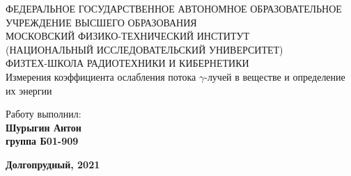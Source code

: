 \begin{center}
    {\small ФЕДЕРАЛЬНОЕ ГОСУДАРСТВЕННОЕ АВТОНОМНОЕ ОБРАЗОВАТЕЛЬНОЕ\\ УЧРЕЖДЕНИЕ ВЫСШЕГО ОБРАЗОВАНИЯ\\ МОСКОВСКИЙ ФИЗИКО-ТЕХНИЧЕСКИЙ ИНСТИТУТ\\ (НАЦИОНАЛЬНЫЙ ИССЛЕДОВАТЕЛЬСКИЙ УНИВЕРСИТЕТ)\\ ФИЗТЕХ-ШКОЛА РАДИОТЕХНИКИ И КИБЕРНЕТИКИ}\\
    \hfill \break
    \hfill \break
    \hfill \break
    \Huge{Измерения коэффициента ослабления потока $\gamma$-лучей в веществе и определение их энергии}\\
\end{center}
  
  \hfill \break
  \hfill \break
  \hfill \break
  \hfill \break
  \hfill \break
  \hfill \break
  
  \begin{flushright}
    \normalsize{Работу выполнил:}\\
    \normalsize{\textbf{Шурыгин Антон \\группа Б01-909}} \\
  \end{flushright}
  
  \begin{center}
    \normalsize{\textbf{Долгопрудный, 2021}}
  \end{center}
  
  
  \thispagestyle{empty} %
  
  
  \newpage
  \thispagestyle{plain}
  \tableofcontents
  \thispagestyle{plain}
  \newpage